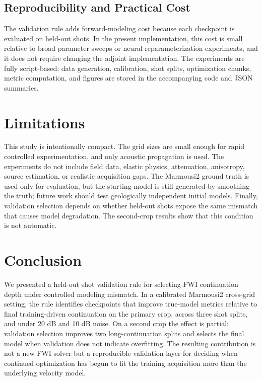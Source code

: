 \documentclass[10pt,twocolumn]{article}
\begin{document}
\subsection{Reproducibility and Practical Cost}
The validation rule adds forward-modeling cost because each checkpoint is
evaluated on held-out shots. In the present implementation, this cost is
small relative to broad parameter sweeps or neural reparameterization
experiments, and it does not require changing the adjoint implementation.
The experiments are fully script-based: data generation, calibration,
shot splits, optimization chunks, metric computation, and figures are
stored in the accompanying code and JSON summaries.

\section{Limitations}
This study is intentionally compact. The grid sizes are small enough for
rapid controlled experimentation, and only acoustic propagation is used.
The experiments do not include field data, elastic physics, attenuation,
anisotropy, source estimation, or realistic acquisition gaps. The
Marmousi2 ground truth is used only for evaluation, but the starting model
is still generated by smoothing the truth; future work should test
geologically independent initial models. Finally, validation selection
depends on whether held-out shots expose the same mismatch that causes
model degradation. The second-crop results show that this condition is not
automatic.

\section{Conclusion}
We presented a held-out shot validation rule for selecting FWI
continuation depth under controlled modeling mismatch. In a calibrated
Marmousi2 cross-grid setting, the rule identifies checkpoints that improve
true-model metrics relative to final training-driven continuation on the
primary crop, across three shot splits, and under 20 dB and 10 dB noise.
On a second crop the effect is partial: validation selection improves two
long-continuation splits and selects the final model when validation does
not indicate overfitting. The resulting contribution is not a new FWI
solver but a reproducible validation layer for deciding when continued
optimization has begun to fit the training acquisition more than the
underlying velocity model.
\end{document}
